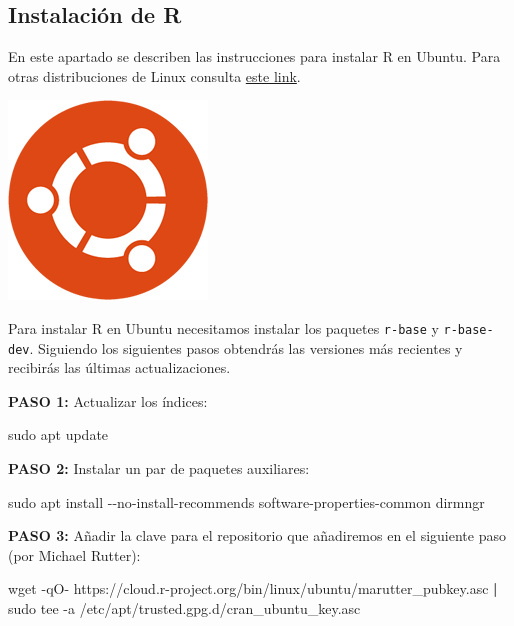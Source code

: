 \documentclass[
  title=normal,
  notoc,
  bib=normal]{mnye}
\newenvironment{Shaded}{\begin{snugshade}}{\end{snugshade}}
\newcommand{\AttributeTok}[1]{\textcolor[rgb]{0.77,0.63,0.00}{#1}}
\newcommand{\FunctionTok}[1]{\textcolor[rgb]{0.00,0.00,0.00}{#1}}
\newcommand{\KeywordTok}[1]{\textcolor[rgb]{0.13,0.29,0.53}{\textbf{#1}}}
\newcommand{\NormalTok}[1]{#1}
\begin{document}
\hypertarget{instalaciuxf3n-de-r}{%
\subsection{Instalación de R}\label{instalaciuxf3n-de-r}}

En este apartado se describen las instrucciones para instalar R en Ubuntu. Para otras distribuciones de Linux consulta \href{https://cloud.r-project.org/bin/linux/}{este link}.

\begin{center}\includegraphics[width=0.15\linewidth]{images/os/ubuntu} \end{center}

Para instalar R en Ubuntu necesitamos instalar los paquetes \texttt{r-base} y \texttt{r-base-dev}. Siguiendo los siguientes pasos obtendrás las versiones más recientes y recibirás las últimas actualizaciones.

\textbf{PASO 1: } Actualizar los índices:

\begin{Shaded}
\begin{Highlighting}[]
\FunctionTok{sudo}\NormalTok{ apt update }
\end{Highlighting}
\end{Shaded}

\textbf{PASO 2: } Instalar un par de paquetes auxiliares:

\begin{Shaded}
\begin{Highlighting}[]
\FunctionTok{sudo}\NormalTok{ apt install }\AttributeTok{{-}{-}no{-}install{-}recommends}\NormalTok{ software{-}properties{-}common dirmngr }
\end{Highlighting}
\end{Shaded}

\textbf{PASO 3: } Añadir la clave para el repositorio que añadiremos en el siguiente paso (por Michael Rutter):

\begin{Shaded}
\begin{Highlighting}[]
\FunctionTok{wget} \AttributeTok{{-}qO{-}}\NormalTok{ https://cloud.r{-}project.org/bin/linux/ubuntu/marutter\_pubkey.asc }\KeywordTok{|} \FunctionTok{sudo}\NormalTok{ tee }\AttributeTok{{-}a}\NormalTok{ /etc/apt/trusted.gpg.d/cran\_ubuntu\_key.asc}
\end{Highlighting}
\end{Shaded}
\end{document}
